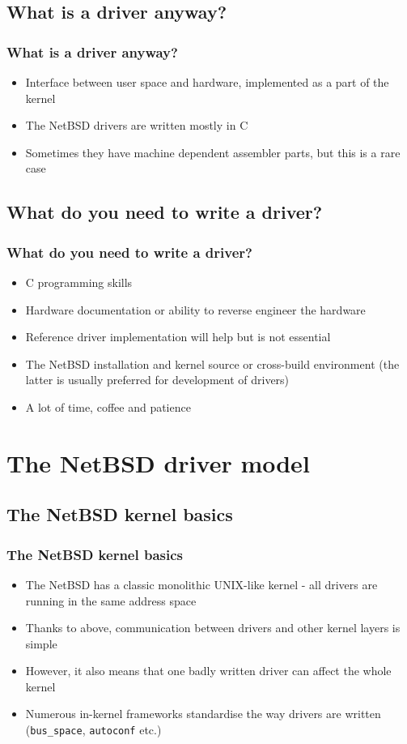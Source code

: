 \documentclass[dvipsnames,table]{beamer}
\begin{document}
\subsection{What is a driver anyway?}

\begin{frame}
\frametitle{What is a driver anyway?}
\begin{itemize}
	\item Interface between user space and hardware, implemented as a part of the kernel
	\item The NetBSD drivers are written mostly in C
	\item Sometimes they have machine dependent assembler parts, but this is a rare case
\end{itemize}
\end{frame}

\subsection{What do you need to write a driver?}

\begin{frame}
\frametitle{What do you need to write a driver?}
\begin{itemize}
	\item C programming skills
	\item Hardware documentation or ability to reverse engineer the hardware
	\item Reference driver implementation will help but is not essential
	\item The NetBSD installation and kernel source or cross-build environment (the latter is usually preferred for development of drivers)
	\item A lot of time, coffee and patience {\Large \smiley}
\end{itemize}
\end{frame}

\section{The NetBSD driver model}
\subsection{The NetBSD kernel basics}

\begin{frame}
\frametitle{The NetBSD kernel basics}
\begin{itemize}
	\item The NetBSD has a classic monolithic UNIX-like kernel - all drivers are running in the same address space
	\item Thanks to above, communication between drivers and other kernel layers is simple
	\item However, it also means that one badly written driver can affect the whole kernel
	\item Numerous in-kernel frameworks standardise the way drivers are written ({\tt bus\_space}, {\tt autoconf} etc.) 
\end{itemize}
\end{frame}
\end{document}
